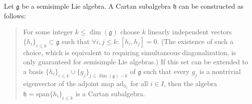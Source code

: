     \begin{construct}
        Let $\mathfrak{g}$ be a semisimple Lie algebra. A Cartan subalgebra $\mathfrak{h}$ can be constructed as follows:
        \begin{quote}
            For some integer $k\leq\dim(\mathfrak{g})$ choose $k$ linearly independent vectors $\{h_i\}_{i\leq k}\subset\mathfrak{g}$ such that $\forall i,j\leq k:[h_i,h_j] = 0$. (The existence of such a choice, which is equivalent to requiring simultaneous diagonalization, is only guaranteed for semisimple Lie algebras.) If this set can be extended to a basis $\{h_i\}_{i\leq k}\cup\{g_j\}_{j\leq \dim(\mathfrak{g})-k}$ of $\mathfrak{g}$ such that every $g_j$ is a nontrivial eigenvector of the adjoint map $\mathrm{ad}_{h_i}$ for all $i\in I$, then the algebra $\mathfrak{h} = \mathrm{span}\{h_i\}_{i\leq k}$ is a Cartan subalgebra.
        \end{quote}
    \end{construct}


